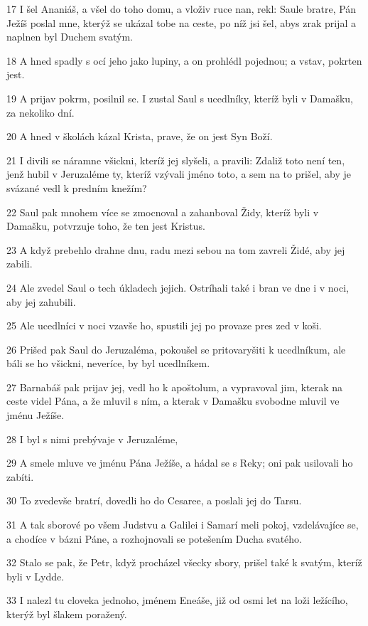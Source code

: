 \par 17 I šel Ananiáš, a všel do toho domu, a vloživ ruce nan, rekl: Saule bratre, Pán Ježíš poslal mne, kterýž se ukázal tobe na ceste, po níž jsi šel, abys zrak prijal a naplnen byl Duchem svatým.
\par 18 A hned spadly s ocí jeho jako lupiny, a on prohlédl pojednou; a vstav, pokrten jest.
\par 19 A prijav pokrm, posilnil se. I zustal Saul s ucedlníky, kteríž byli v Damašku, za nekoliko dní.
\par 20 A hned v školách kázal Krista, prave, že on jest Syn Boží.
\par 21 I divili se náramne všickni, kteríž jej slyšeli, a pravili: Zdaliž toto není ten, jenž hubil v Jeruzaléme ty, kteríž vzývali jméno toto, a sem na to prišel, aby je svázané vedl k predním knežím?
\par 22 Saul pak mnohem více se zmocnoval a zahanboval Židy, kteríž byli v Damašku, potvrzuje toho, že ten jest Kristus.
\par 23 A když prebehlo drahne dnu, radu mezi sebou na tom zavreli Židé, aby jej zabili.
\par 24 Ale zvedel Saul o tech úkladech jejich. Ostríhali také i bran ve dne i v noci, aby jej zahubili.
\par 25 Ale ucedlníci v noci vzavše ho, spustili jej po provaze pres zed v koši.
\par 26 Prišed pak Saul do Jeruzaléma, pokoušel se pritovaryšiti k ucedlníkum, ale báli se ho všickni, neveríce, by byl ucedlníkem.
\par 27 Barnabáš pak prijav jej, vedl ho k apoštolum, a vypravoval jim, kterak na ceste videl Pána, a že mluvil s ním, a kterak v Damašku svobodne mluvil ve jménu Ježíše.
\par 28 I byl s nimi prebývaje v Jeruzaléme,
\par 29 A smele mluve ve jménu Pána Ježíše, a hádal se s Reky; oni pak usilovali ho zabíti.
\par 30 To zvedevše bratrí, dovedli ho do Cesaree, a poslali jej do Tarsu.
\par 31 A tak sborové po všem Judstvu a Galilei i Samarí meli pokoj, vzdelávajíce se, a chodíce v bázni Páne, a rozhojnovali se potešením Ducha svatého.
\par 32 Stalo se pak, že Petr, když procházel všecky sbory, prišel také k svatým, kteríž byli v Lydde.
\par 33 I nalezl tu cloveka jednoho, jménem Eneáše, již od osmi let na loži ležícího, kterýž byl šlakem poražený.
